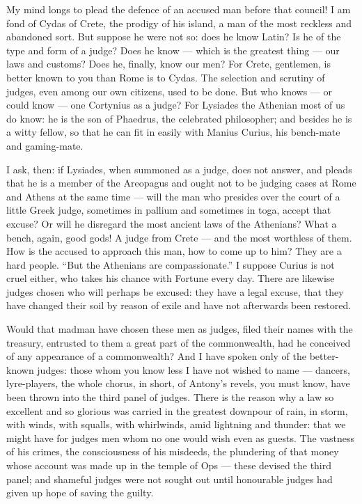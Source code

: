  My mind longs to plead the defence of an accused man before that council! I am fond of Cydas of Crete, the prodigy of his island, a man of the most reckless and abandoned sort. But suppose he were not so: does he know Latin? Is he of the type and form of a judge? Does he know --- which is the greatest thing --- our laws and customs? Does he, finally, know our men? For Crete, gentlemen, is better known to you than Rome is to Cydas. The selection and scrutiny of judges, even among our own citizens, used to be done. But who knows --- or could know --- one Cortynius as a judge? For Lysiades the Athenian most of us do know: he is the son of Phaedrus, the celebrated philosopher; and besides he is a witty fellow, so that he can fit in easily with Manius Curius, his bench-mate and gaming-mate.

 I ask, then: if Lysiades, when summoned as a judge, does not answer, and pleads that he is a member of the Areopagus and ought not to be judging cases at Rome and Athens at the same time --- will the man who presides over the court of a little Greek judge, sometimes in pallium and sometimes in toga, accept that excuse? Or will he disregard the most ancient laws of the Athenians? What a bench, again, good gods! A judge from Crete --- and the most worthless of them. How is the accused to approach this man, how to come up to him? They are a hard people. ``But the Athenians are compassionate.'' I suppose Curius is not cruel either, who takes his chance with Fortune every day. There are likewise judges chosen who will perhaps be excused: they have a legal excuse, that they have changed their soil by reason of exile and have not afterwards been restored.

 Would that madman have chosen these men as judges, filed their names with the treasury, entrusted to them a great part of the commonwealth, had he conceived of any appearance of a commonwealth? And I have spoken only of the better-known judges: those whom you know less I have not wished to name --- dancers, lyre-players, the whole chorus, in short, of Antony's revels, you must know, have been thrown into the third panel of judges. There is the reason why a law so excellent and so glorious was carried in the greatest downpour of rain, in storm, with winds, with squalls, with whirlwinds, amid lightning and thunder: that we might have for judges men whom no one would wish even as guests. The vastness of his crimes, the consciousness of his misdeeds, the plundering of that money whose account was made up in the temple of Ops --- these devised the third panel; and shameful judges were not sought out until honourable judges had given up hope of saving the guilty.

